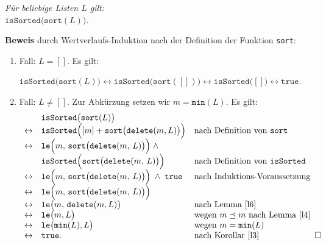 \begin{Satz} 
{\em 
  F\"ur beliebige Listen $L$ gilt: \\[0.1cm]
  \hspace*{1.3cm} $\mathtt{isSorted}\bigl(\mathtt{sort}(L)\bigr)$.
}
\end{Satz}
\textbf{Beweis} durch Wertverlaufs-Induktion nach der Definition der Funktion \texttt{sort}:
\begin{enumerate}
\item Fall: $L=[]$.  Es gilt:

      \hspace*{1.3cm} 
       $\mathtt{isSorted}\bigl(\mathtt{sort}(L)\bigr) \leftrightarrow \mathtt{isSorted}\bigl(\mathtt{sort}([])\bigr) \leftrightarrow
          \mathtt{isSorted}\bigl([]\bigr) \leftrightarrow \mathtt{true}$.
\item Fall: $L \not= []$. Zur Abk\"urzung setzen wir $m = \mathtt{min}(L)$.  Es gilt:
      \[
      \begin{array}[b]{cll}
          & \mathtt{isSorted}\bigl(\mathtt{sort}(L)\bigr) \\ 
        \leftrightarrow & \mathtt{isSorted}\Bigl([m] + \mathtt{sort}\bigl(\mathtt{delete}(m,L)\bigr)\Bigr) &
                          \mbox{nach Definition von \texttt{sort}}     \\
        \leftrightarrow & \mathtt{le}\Bigl(m,\, \mathtt{sort}\bigl(\mathtt{delete}(m,\,L)\bigr)\Bigr) \;\wedge\; \\
                        & \mathtt{isSorted}\Bigl(\mathtt{sort}\bigl(\mathtt{delete}(m,\,L)\bigr)\Bigr) & 
                          \mbox{nach Definition von \texttt{isSorted}}     \\
        \leftrightarrow & \mathtt{le}\Bigl(m,\, \mathtt{sort}\bigl(\mathtt{delete}(m,\,L)\bigr)\Bigr) \;\wedge\;
                          \mathtt{true} &
                          \mbox{nach Induktions-Voraussetzung}     \\
        \leftrightarrow & \mathtt{le}\Bigl(m,\, \mathtt{sort}\bigl(\mathtt{delete}(m,\,L)\bigr)\Bigr) \\
        \leftrightarrow & \mathtt{le}\bigl(m,\, \mathtt{delete}(m,L)\bigr) &
                          \mbox{nach Lemma \ref{l6}}     \\
        \leftrightarrow & \mathtt{le}\bigl(m, L\bigr) &
                          \mbox{wegen $m \preceq m$ nach Lemma \ref{l4}}     \\
        \leftrightarrow & \mathtt{le}\bigl(\mathtt{min}(L), L\bigr) &
                          \mbox{wegen $m = \mathtt{min}(L)$}     \\
        \leftrightarrow & \mathtt{true}. &
                          \mbox{nach Korollar \ref{l3}}     
      \end{array}\hspace*{\fill} \Box
      \]
\end{enumerate}
